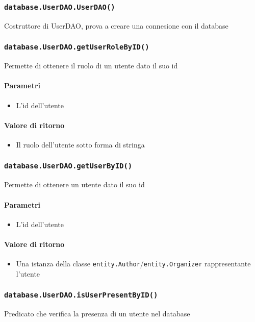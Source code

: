 \subsubsection{\texttt{database.UserDAO.UserDAO()}}
Costruttore di UserDAO, prova a creare una connesione con il database

\subsubsection{\texttt{database.UserDAO.getUserRoleByID()}}
Permette di ottenere il ruolo di un utente dato il suo id
\paragraph{Parametri}
\begin{itemize}
\item L'id dell'utente
\end{itemize}
\paragraph{Valore di ritorno}
\begin{itemize}
\item Il ruolo dell'utente sotto forma di stringa
\end{itemize}

\subsubsection{\texttt{database.UserDAO.getUserByID()}}
Permette di ottenere un utente dato il suo id
\paragraph{Parametri}
\begin{itemize}
\item L'id dell'utente
\end{itemize}
\paragraph{Valore di ritorno}
\begin{itemize}
\item Una istanza della classe
  \texttt{entity.Author}/\texttt{entity.Organizer} rappresentante
  l'utente
\end{itemize}

\subsubsection{\texttt{database.UserDAO.isUserPresentByID()}}
Predicato che verifica la presenza di un utente nel database
